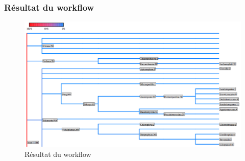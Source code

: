 \documentclass[12pt]{beamer}
\begin{document}
\begin{frame}
\frametitle{Résultat du workflow}
\begin{figure}
   \begin{center}
 \includegraphics[scale=0.2]{img/resultat.png}
 	\caption{Résultat du workflow}
   \end{center}
  \end{figure}
\end{frame}
\end{document}
